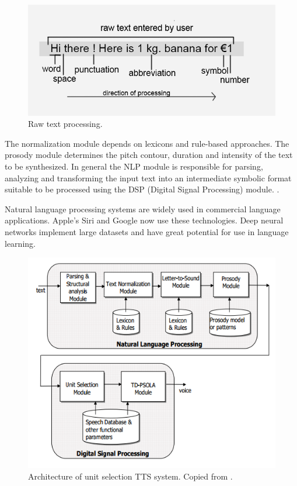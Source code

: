 \documentclass[11pt,a4paper,oneside,article]{memoir}
\begin{document}
\begin{figure}[h]
  \includegraphics[width=12cm]{rawtext}
  \caption{Raw text processing.}
  \label{fig:rawtext}
\end{figure}
The normalization module depends on lexicons and rule-based approaches. The prosody module determines the pitch contour, duration and intensity of the text to be synthesized. In general the NLP module is responsible for parsing, analyzing and transforming the input text into an intermediate symbolic format suitable to be processed using the DSP (Digital Signal Processing) module. \cite{chala}.

Natural language processing systems are widely used in commercial language applications. Apple's Siri and Google now use these technologies. Deep neural networks implement large datasets and have great potential for use in language learning. \cite{markowitz}

\begin{figure}[h]
  \includegraphics[width=12cm]{nlp}
  \caption{Architecture of unit selection TTS system. Copied from \cite{chala}.}
  \label{fig:nlp}
\end{figure}
\end{document}
